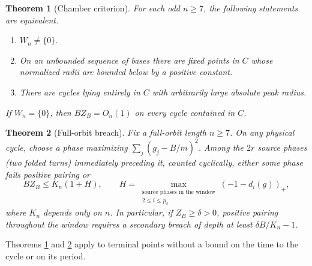 \documentclass[11pt,reqno]{amsart}
\newtheorem{theorem}{Theorem}
\theoremstyle{definition}
\begin{document}
\begin{theorem}[Chamber criterion]\label{th:chamber}
For each odd \(n\ge7\), the following statements are equivalent.
\begin{enumerate}
\item \(W_n\ne\{0\}\).
\item On an unbounded sequence of bases there are fixed points in \(C\) whose normalized radii are bounded below by a positive constant.
\item There are cycles lying entirely in \(C\) with arbitrarily large absolute peak radius.
\end{enumerate}
If \(W_n=\{0\}\), then \(BZ_B=O_n(1)\) on every cycle contained in \(C\).
\end{theorem}

\begin{theorem}[Full-orbit breach]\label{th:breach}
Fix a full-orbit length \(n\ge7\). On any physical cycle, choose a phase maximizing \(\sum_j(g_j-B/m)^2\). Among the \(2r\) source phases (two folded turns) immediately preceding it, counted cyclically, either some phase fails positive pairing or
\[
 BZ_B\le K_n(1+H),\qquad
 H=\max_{\substack{\text{source phases in the window}\\2\le i\le p_0}}(-1-d_i(g))_+ ,
\]
where \(K_n\) depends only on \(n\). In particular, if \(Z_B\ge\delta>0\), positive pairing throughout the window requires a secondary breach of depth at least \(\delta B/K_n-1\).
\end{theorem}

Theorems \ref{th:chamber} and \ref{th:breach} apply to terminal points without a bound on the time to the cycle or on its period.
\end{document}
